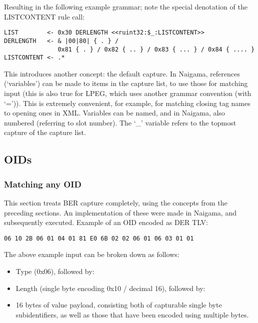 Resulting in the following example grammar; note the special denotation of 
the LISTCONTENT rule call:

\begin{changemargin}{-60mm}{0mm}
\begin{myquote}
\begin{verbatim}
LIST        <- 0x30 DERLENGTH <<ruint32:$_:LISTCONTENT>>
DERLENGTH   <- & |00|80| { . } /
               0x81 { . } / 0x82 { .. } / 0x83 { ... } / 0x84 { .... }
LISTCONTENT <- .*
\end{verbatim}
\end{myquote}
\end{changemargin}

This introduces another concept: the default capture. In Naigama, 
references (‘variables’) can be made to items in the capture list, to 
use those for matching input (this is also true for LPEG, which uses 
another grammar convention (with ‘=’)). This is extremely convenient, 
for example, for matching closing tag names to opening ones in XML. 
Variables can be named, and in Naigama, also numbered (referring to slot 
number). The ‘\_’ variable refers to the topmost capture of the capture 
list.

\subsection{OIDs}

\subsubsection{Matching any OID}

This section treats BER capture completely, using the concepts from the 
preceding sections. An implementation of these were made in Naigama, and 
subsequently executed. 
Example of an OID encoded as DER TLV:

\begin{changemargin}{-60mm}{0mm}
\begin{myquote}
\begin{verbatim}
06 10 2B 06 01 04 01 81 E0 6B 02 02 06 01 06 03 01 01
\end{verbatim}
\end{myquote}
\end{changemargin}

The above example input can be broken down as follows:

\begin{itemize}
    \item Type (0x06), followed by:
    \item Length (single byte encoding 0x10 / decimal 16), followed by:
    \item 16 bytes of value payload, consisting both of capturable single 
byte subidentifiers, as well as those that have been encoded using 
multiple bytes.
\end{itemize}

